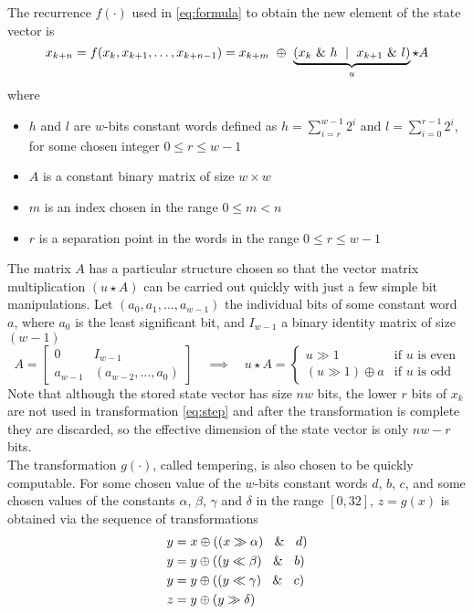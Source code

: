 \documentclass[preprint,1p,times]{elsarticle}
\begin{document}
The recurrence $f(\cdot)$ used in \eqref{eq:formula} to obtain the new element of the state vector is
\begin{equation}
\label{eq:step}
    x_{k+n} = f(x_{k},x_{k+1}, \dots, x_{k+n-1}) = x_{k+m} ~\mathbin{\oplus} ~\underbrace{\left({x_k}~\&~h ~\mid~ x_{k+1}~\&~l\right) }_u \star A 
\end{equation}
where
\begin{itemize}
    \item $h$ and $l$ are $w$-bits constant words defined as $h=\sum_{i=r}^{w-1}2^i$ and $l=\sum_{i=0}^{r-1}2^i$, for some chosen integer $0 \le r \le w-1$ 
    \item $A$ is a constant binary matrix of size $w \times w$
    \item $m$ is an index chosen in the range $0 \le m < n$
    \item $r$ is a separation point in the words in the range $0 \le r \le w-1$
\end{itemize}
The matrix $A$ has a particular structure chosen so that the vector matrix multiplication $(u\star A)$ can be carried out quickly with just a few simple bit manipulations. Let $(a_0, a_1, \dots, a_{w-1})$ the individual bits of some constant word $a$, where $a_0$ is the least significant bit, and $I_{w-1}$ a binary identity matrix of size $(w-1)$
\begin{equation}
\label{eq:matmult}
A = \left[ \begin{matrix} 0 & I_{w - 1} \\ a_{w-1} & (a_{w - 2}, \ldots , a_0) \end{matrix} \right] \quad \implies \quad u\star A = \begin{cases}u \gg 1 & \text{if $u$ is even}\\(u \gg 1) \oplus a & \text{if $u$ is odd}\end{cases}
\end{equation}
Note that although the stored state vector has size $nw$ bits, the lower $r$ bits of $x_k$ are not used in transformation \eqref{eq:step} and after the transformation is complete they are discarded, so the effective dimension of the state vector is only $nw-r$ bits. \\ %

The transformation $g(\cdot)$, called tempering, is also chosen to be quickly computable. For some chosen value of the $w$-bits constant words $d$, $b$, $c$, and some chosen values of the constants $\alpha$, $\beta$, $\gamma$ and $\delta$ in the range $[0,32]$, $z=g(x)$ is obtained via the sequence of transformations
\begin{equation}
\label{eq:tempering}
\begin{aligned}
y &= x \oplus ((x\gg \alpha)~\And~d)\\
y &= y \oplus ((y\ll \beta)~\And~b)\\
y &= y \oplus ((y\ll \gamma)~\And~c)\\
z &= y \oplus (y\gg \delta)
\end{aligned}
\end{equation}
\end{document}
